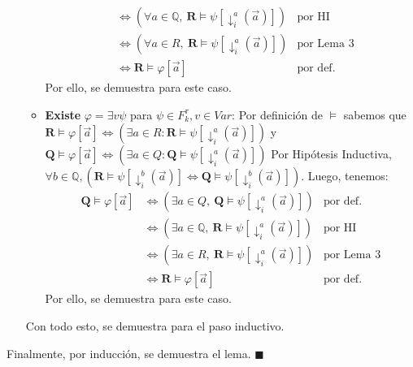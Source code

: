 \documentclass{article}
\begin{document}
\begin{itemize}
\begin{itemize}
\begin{equation*}
\begin{aligned}
                                                     & \iff(\forall a\in\mathbb{Q},\ \mathbf{R}\vDash\psi[\downarrow^a_i(\vec{a})]) & \text{por HI}     \\
                                                     & \iff(\forall a\in R,\ \mathbf{R}\vDash\psi[\downarrow^a_i(\vec{a})])         & \text{por Lema 3} \\
                                                     & \iff\mathbf{R}\vDash\varphi[\vec{a}]                                         & \text{por def.}
                  \end{aligned}
                \end{equation*}
                \hspace*{0.5cm} Por ello, se demuestra para este caso.
          \item \textbf{Existe} $\varphi=\exists v\psi$ para $\psi\in F^\tau_k, v\in Var$: \newline
                \hspace*{0.5cm} Por definición de $\vDash$ sabemos que $\mathbf{R}\vDash\varphi[\vec{a}]\iff(\exists a\in R:\mathbf{R}\vDash\psi[\downarrow^a_i(\vec{a})])$ y $\mathbf{Q}\vDash\varphi[\vec{a}]\iff(\exists a\in Q:\mathbf{Q}\vDash\psi[\downarrow^a_i(\vec{a})])$ \newline
                \hspace*{0.5cm} Por Hipótesis Inductiva, $\forall b\in\mathbb{Q},(\mathbf{R}\vDash\psi[\downarrow^b_i(\vec{a})]\iff\mathbf{Q}\vDash\psi[\downarrow^b_i(\vec{a})])$. \newline
                \hspace*{0.5cm} Luego, tenemos:
                \begin{equation*}
                  \begin{aligned}
                    \mathbf{Q}\vDash\varphi[\vec{a}] & \iff(\exists a\in Q,\ \mathbf{Q}\vDash\psi[\downarrow^a_i(\vec{a})])         & \text{por def.}   \\
                                                     & \iff(\exists a\in\mathbb{Q},\ \mathbf{R}\vDash\psi[\downarrow^a_i(\vec{a})]) & \text{por HI}     \\
                                                     & \iff(\exists a\in R,\ \mathbf{R}\vDash\psi[\downarrow^a_i(\vec{a})])         & \text{por Lema 3} \\
                                                     & \iff\mathbf{R}\vDash\varphi[\vec{a}]                                         & \text{por def.}
                  \end{aligned}
                \end{equation*}
                \hspace*{0.5cm} Por ello, se demuestra para este caso.
        \end{itemize}
        Con todo esto, se demuestra para el paso inductivo.
\end{itemize}
Finalmente, por inducción, se demuestra el lema. $\blacksquare$
\end{document}
